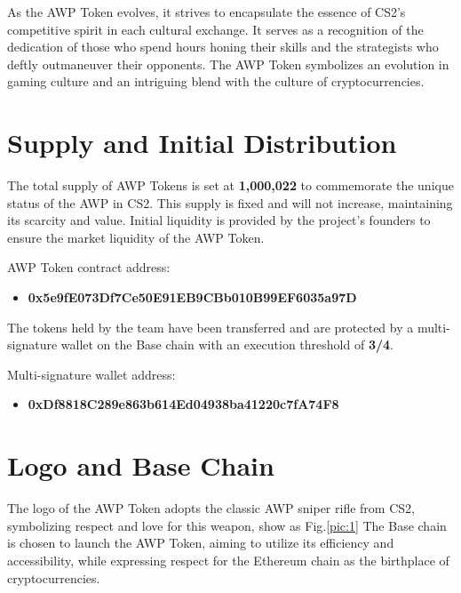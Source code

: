 \documentclass[journal,onecolumn,]{IEEEtran}
\begin{document}
	As the AWP Token evolves, it strives to encapsulate the essence of CS2's competitive spirit in each cultural exchange. It serves as a recognition of the dedication of those who spend hours honing their skills and the strategists who deftly outmaneuver their opponents. The AWP Token symbolizes an evolution in gaming culture and an intriguing blend with the culture of cryptocurrencies.



	\section{Supply and Initial Distribution}
	The total supply of AWP Tokens is set at \textbf{1,000,022} to commemorate the unique status of the AWP in CS2. This supply is fixed and will not increase, maintaining its scarcity and value. Initial liquidity is provided by the project's founders to ensure the market liquidity of the AWP Token.
	
		
	AWP Token contract address: 
	
	\begin{itemize}
		\item 	\textbf{0x5e9fE073Df7Ce50E91EB9CBb010B99EF6035a97D}
	\end{itemize}
	
	The tokens held by the team have been transferred and are protected by a multi-signature wallet on the Base chain with an execution threshold of \textbf{3/4}.
	
	 Multi-signature wallet address: 
	 
	 	\begin{itemize}
	 	\item 	\textbf{0xDf8818C289e863b614Ed04938ba41220c7fA74F8}
	 \end{itemize}
	 
	  

	
	 
	
	\section{Logo and Base Chain}
	The logo of the AWP Token adopts the classic AWP sniper rifle from CS2, symbolizing respect and love for this weapon, show as Fig.\ref{pic:1} The Base chain is chosen to launch the AWP Token, aiming to utilize its efficiency and accessibility, while expressing respect for the Ethereum chain as the birthplace of cryptocurrencies.
	
	
	
\end{document}
